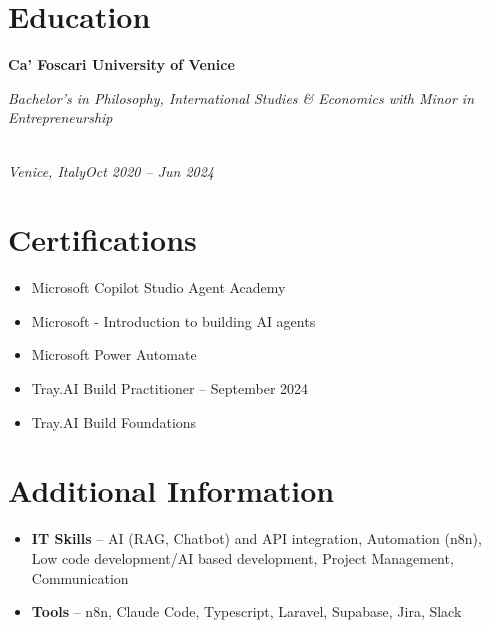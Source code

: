 \documentclass[a4paper,10pt]{article}
\newcommand{\role}[4]{\vspace{3pt}\noindent\hspace{0.6em}\parbox[t]{0.38\textwidth}{\raggedright\textbf{#1}}\hfill\parbox[t]{0.58\textwidth}{\raggedleft\textit{#2}}\\{\textit{#3}\hfill\textit{#4}}\vspace{1pt}}
\begin{document}
\section{Education}
\role{Ca' Foscari University of Venice}{Bachelor's in Philosophy, International Studies \& Economics with Minor in Entrepreneurship}{Venice, Italy}{Oct 2020 -- Jun 2024}

\section{Certifications}
\begin{itemize}
\item Microsoft Copilot Studio Agent Academy
\item Microsoft - Introduction to building AI agents
\item Microsoft Power Automate
\item Tray.AI Build Practitioner -- September 2024
\item Tray.AI Build Foundations
\end{itemize}

\section{Additional Information}
\begin{itemize}
\item \textbf{IT Skills} -- AI (RAG, Chatbot) and API integration, Automation (n8n), Low code development/AI based development, Project Management, Communication
\item \textbf{Tools} -- n8n, Claude Code, Typescript, Laravel, Supabase, Jira, Slack
\end{itemize}
\end{document}
